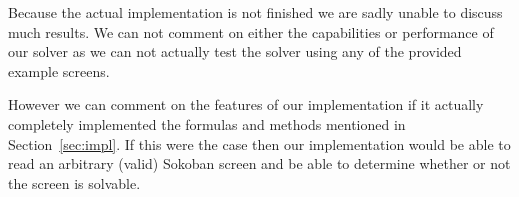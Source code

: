 Because the actual implementation is not finished we are sadly unable to
discuss much results. We can not comment on either the capabilities or 
performance of our solver as we can not actually test the solver using any
of the provided example screens.

However we can comment on the features of our implementation if it actually 
completely implemented the formulas and methods mentioned in 
Section~\ref{sec:impl}. If this were the case then our implementation
would be able to read an arbitrary (valid) Sokoban screen and be able to
determine whether or not the screen is solvable. 